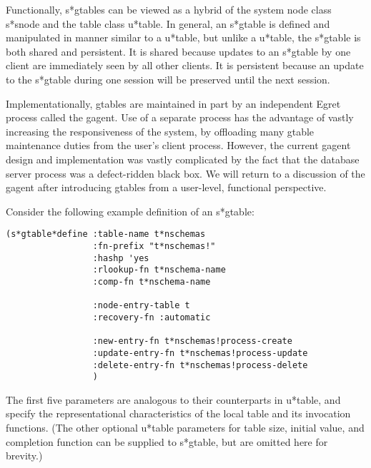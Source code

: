 Functionally, s*gtables can be viewed as a hybrid of the system node class
s*snode and the
table class u*table.  In general, an s*gtable is defined and manipulated in
manner similar to a u*table, but unlike a u*table, the s*gtable is both
shared and persistent.  It is shared because updates to an s*gtable by one
client are immediately seen by all other clients.  It is persistent because
an update to the s*gtable during one session will be preserved until the
next session.

Implementationally, gtables are maintained in part by an independent Egret
process called the gagent.  Use of a separate process has the advantage of vastly
increasing the responsiveness of the system, by offloading many gtable
maintenance duties from the user's client process.  However, the current
gagent design and implementation was vastly complicated by the fact that
the database server process was a defect-ridden black box.  We will return
to a discussion of the gagent after introducing gtables from a user-level,
functional perspective.

Consider the following example definition of an s*gtable:

\small\begin{verbatim}
(s*gtable*define :table-name t*nschemas
                 :fn-prefix "t*nschemas!"
                 :hashp 'yes
                 :rlookup-fn t*nschema-name
                 :comp-fn t*nschema-name

                 :node-entry-table t
                 :recovery-fn :automatic

                 :new-entry-fn t*nschemas!process-create
                 :update-entry-fn t*nschemas!process-update
                 :delete-entry-fn t*nschemas!process-delete
                 )
\end{verbatim}\normalsize

The first five parameters are analogous to their counterparts in
u*table, and specify the representational characteristics of the local
table and its invocation functions.  (The other optional u*table
parameters for table size, initial value, and completion function can
be supplied to s*gtable, but are omitted here for brevity.)

